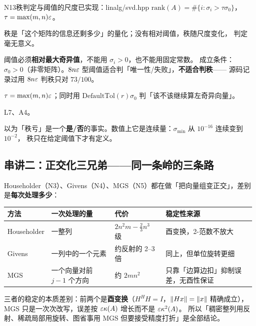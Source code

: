 \begin{know}{N13}{秩判定与阈值的尺度}{已实现：linalg/svd.hpp}
 $\mathrm{rank}(A)=\#\{i:\sigma_i>\tau\sigma_0\}$，$\tau=\max(m,n)\varepsilon$。

 秩是「这个矩阵的信息还剩多少」的量化；没有相对阈值，秩随尺度变化，
判定毫无意义。

 阈值必须\textbf{相对最大奇异值}，不能用 $\sigma_i>0$，也不能用固定常数。
成立条件：$\sigma_0>0$（非零矩阵）。$8n\varepsilon$ 型阈值适合判「唯一性/失败」，\textbf{不适合判秩}——
源码记录过用 $8n\varepsilon$ 判秩只对 $73/100$。

 $\tau=\max(m,n)\varepsilon$；同时用 $\mathrm{DefaultTol}(r)\sigma_0$ 判「该不该继续算左奇异向量」。

 L7、A4。

 以为「秩亏」是一个\textbf{是/否}的事实。数值上它是连续量：$\sigma_{\min}$ 从 $10^{-16}$ 连续变到 $10^{-2}$，
秩只在给定阈值下才有定义。
\end{know}

\subsection*{串讲二：正交化三兄弟——同一条岭的三条路}

Householder（N3）、Givens（N4）、MGS（N5）都在做「把向量组变正交」，差别是\textbf{每次处理多少}：

\begin{center}
\begin{tabular}{L{2.1cm}L{2.8cm}L{3.9cm}L{4.8cm}}
\toprule
方法 & 一次处理的量 & 代价 & 稳定性来源 \\
\midrule
Householder & 一整列 & $2n^{2}m-\frac23n^{3}$ 级 & 酉变换，2-范数不放大 \\
Givens & 一列中的一个元素 & 约反射的 2--3 倍 & 同上，但单位旋转更细 \\
MGS & 一个向量对前 $j-1$ 个方向 & 约 $2mn^{2}$ & 只靠「边算边扣」抑制误差，无酉性保证 \\
\bottomrule
\end{tabular}
\end{center}

三者的稳定的本质差别：前两个是\textbf{酉变换}（$H^{H}H=I$，$\left\lVert Hx\right\rVert=\left\lVert x\right\rVert$ 精确成立），
MGS 只是一次次改写，误差按 $\varepsilon\kappa(A)$ 增长而不是 $\varepsilon\kappa^{2}(A)$。
所以「稠密整列用反射、稀疏局部用旋转、图省事用 MGS 但要接受精度打折」是全部结论。
